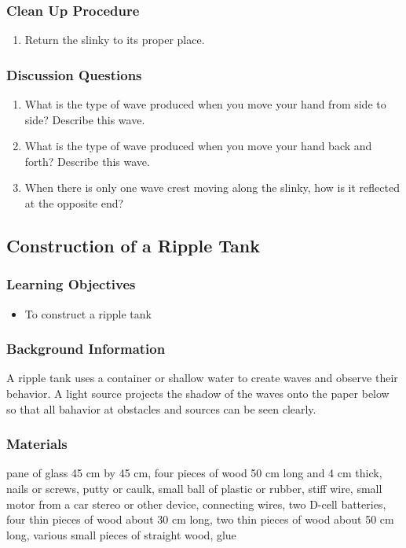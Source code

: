 \subsubsection*{Clean Up Procedure}
\begin{enumerate}
\item{Return the slinky to its proper place.} 
\end{enumerate}

\subsubsection*{Discussion Questions}
\begin{enumerate}
\item{What is the type of wave produced when you move your hand from side to side? Describe this wave.} 
\item{What is the type of wave produced when you move your hand back and forth? Describe this wave.} 
\item{When there is only one wave crest moving along the slinky, how is it reflected at the opposite end?}
\end{enumerate}


\subsection{Construction of a Ripple Tank}

\subsubsection*{Learning Objectives}
\begin{itemize}
\item{To construct a ripple tank} 
\end{itemize}

\subsubsection*{Background Information}
A ripple tank uses a container or shallow water to create waves and observe their behavior. A light source projects the shadow of the waves onto the paper below so that all bahavior at obstacles and sources can be seen clearly.

\subsubsection*{Materials}
pane of glass 45 cm by 45 cm, four pieces of wood 50 cm long and 4 cm thick, nails or screws, putty or caulk, small ball of plastic or rubber, stiff wire, small motor from a car stereo or other device, connecting wires, two D-cell batteries, four thin pieces of wood about 30 cm long, two thin pieces of wood about 50 cm long, various small pieces of straight wood, glue


